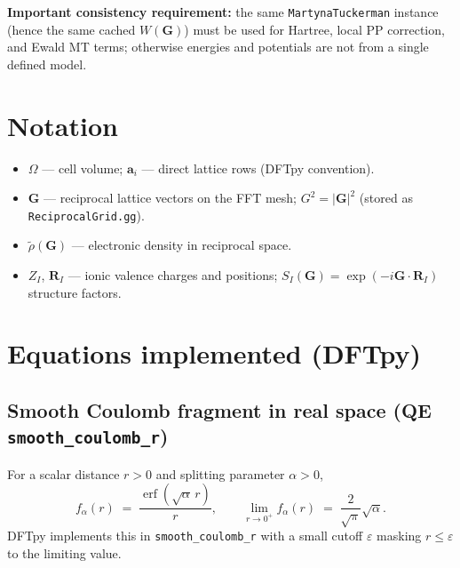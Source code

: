\documentclass[11pt,a4paper]{article}
\begin{document}
\noindent\textbf{Important consistency requirement:} the same \texttt{MartynaTuckerman}
instance (hence the same cached $W(\mathbf G)$) must be used for Hartree, local PP
correction, and Ewald MT terms; otherwise energies and potentials are not from a
single defined model.

\section{Notation}

\begin{itemize}
  \item $\Omega$ --- cell volume; $\mathbf a_i$ --- direct lattice rows (DFTpy convention).
  \item $\mathbf G$ --- reciprocal lattice vectors on the FFT mesh;
        $G^2 = |\mathbf G|^2$ (stored as \texttt{ReciprocalGrid.gg}).
  \item $\tilde\rho(\mathbf G)$ --- electronic density in reciprocal space.
  \item $Z_I$, $\mathbf R_I$ --- ionic valence charges and positions;
        $S_I(\mathbf G)=\exp(-i\mathbf G\cdot\mathbf R_I)$ structure factors.
\end{itemize}

\section{Equations implemented (DFTpy)}

\subsection{Smooth Coulomb fragment in real space (QE \texttt{smooth\_coulomb\_r})}

For a scalar distance $r>0$ and splitting parameter $\alpha>0$,
\begin{equation}
  f_\alpha(r) \;=\; \frac{\operatorname{erf}(\sqrt{\alpha}\,r)}{r},
  \qquad
  \lim_{r\to 0^+} f_\alpha(r) \;=\; \frac{2}{\sqrt{\pi}}\sqrt{\alpha}.
\end{equation}
DFTpy implements this in \texttt{smooth\_coulomb\_r} with a small cutoff $\varepsilon$
masking $r\le\varepsilon$ to the limiting value.
\end{document}
